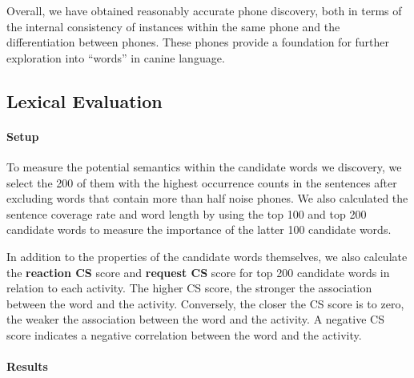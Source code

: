 Overall, we have obtained reasonably accurate phone discovery,
both in terms of the internal consistency of instances within the same phone
and the differentiation between phones.
These phones provide a foundation for further exploration into ``words'' in canine language.

\subsection{Lexical Evaluation}

\paragraph{Setup}

To measure the potential semantics within the candidate words we discovery,
we select the 200 of them with the highest occurrence counts in the sentences
after excluding words that contain more than half noise phones.
We also calculated the sentence coverage rate and word length by using the top 100 and top 200 candidate words
to measure the importance of the latter 100 candidate words.

In addition to the properties of the candidate words themselves,
we also calculate the \textbf{reaction CS} score and \textbf{request CS} score for top 200 candidate words in relation to each activity. The higher CS score, the stronger the association between the word and the activity.
Conversely, the closer the CS score is to zero, the weaker the association between the word and the activity.
A negative CS score indicates a negative correlation between the word and the activity.




\paragraph{Results}

